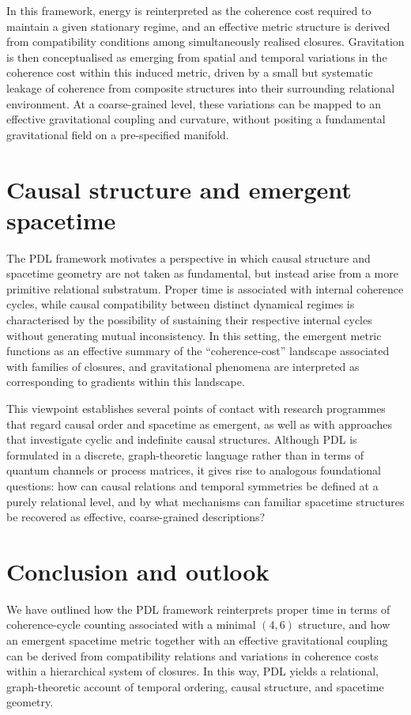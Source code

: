 \documentclass[11pt,a4paper]{article}
\begin{document}
In this framework, energy is reinterpreted as the coherence cost required to maintain a given stationary regime, and an effective metric structure is derived from compatibility conditions among simultaneously realised closures. Gravitation is then conceptualised as emerging from spatial and temporal variations in the coherence cost within this induced metric, driven by a small but systematic leakage of coherence from composite structures into their surrounding relational environment. At a coarse-grained level, these variations can be mapped to an effective gravitational coupling and curvature, without positing a fundamental gravitational field on a pre-specified manifold.

\section{Causal structure and emergent spacetime}

The PDL framework motivates a perspective in which causal structure and spacetime geometry are not taken as fundamental, but instead arise from a more primitive relational substratum. Proper time is associated with internal coherence cycles, while causal compatibility between distinct dynamical regimes is characterised by the possibility of sustaining their respective internal cycles without generating mutual inconsistency. In this setting, the emergent metric functions as an effective summary of the “coherence-cost” landscape associated with families of closures, and gravitational phenomena are interpreted as corresponding to gradients within this landscape.

This viewpoint establishes several points of contact with research programmes that regard causal order and spacetime as emergent, as well as with approaches that investigate cyclic and indefinite causal structures. Although PDL is formulated in a discrete, graph-theoretic language rather than in terms of quantum channels or process matrices, it gives rise to analogous foundational questions: how can causal relations and temporal symmetries be defined at a purely relational level, and by what mechanisms can familiar spacetime structures be recovered as effective, coarse-grained descriptions?

\section{Conclusion and outlook}

We have outlined how the PDL framework reinterprets proper time in terms of coherence-cycle counting associated with a minimal $(4,6)$ structure, and how an emergent spacetime metric together with an effective gravitational coupling can be derived from compatibility relations and variations in coherence costs within a hierarchical system of closures. In this way, PDL yields a relational, graph-theoretic account of temporal ordering, causal structure, and spacetime geometry.
\end{document}
